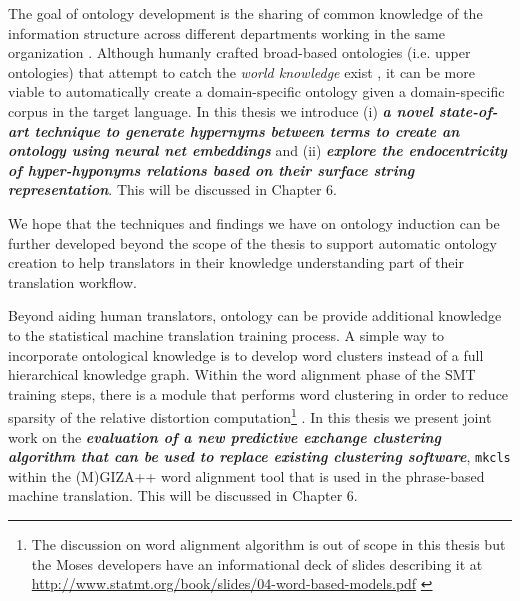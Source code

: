 The goal of ontology development is the sharing of common knowledge of the information structure across different departments working in the same organization \citep{MUSEN1992435,gruber1993translation}. Although humanly crafted broad-based ontologies (i.e. upper ontologies) that attempt to catch the \textit{world knowledge} exist  \citep{lenat1995cyc,PeaseEtAl2002sumo,navigli2012babelnet}, it can be more viable to automatically create a domain-specific ontology given a domain-specific corpus in the target language. In this thesis we introduce (i) \textbf{\textit{a novel state-of-art technique to generate hypernyms between terms to create an ontology using neural net embeddings}} and (ii) \textbf{\textit{explore the endocentricity of hyper-hyponyms relations based on their surface string representation}}. This will be discussed in Chapter 6.

We hope that the techniques and findings we have on ontology induction can be further developed beyond the scope of the thesis to support automatic ontology creation to help translators in their knowledge understanding part of their translation workflow.

Beyond aiding human translators, ontology can be provide additional knowledge to the statistical machine translation training process. A simple way to incorporate ontological knowledge is to develop word clusters instead of a full hierarchical knowledge graph. Within the word alignment phase of the SMT training steps, there is a module that performs word clustering in order to reduce sparsity of the relative distortion computation\footnote{The discussion on word alignment algorithm is out of scope in this thesis but the Moses developers have an informational deck of slides describing it at \url{http://www.statmt.org/book/slides/04-word-based-models.pdf} \citep{koehn2009statistical}} \citep{och2003systematic}. In this thesis we present joint work on the \textit{\textbf{evaluation of a new predictive exchange clustering algorithm that can be used to replace  existing clustering software}}, {\tt mkcls} within the (M)GIZA++ word alignment tool that is used in the phrase-based machine translation. This will be discussed in Chapter 6.
